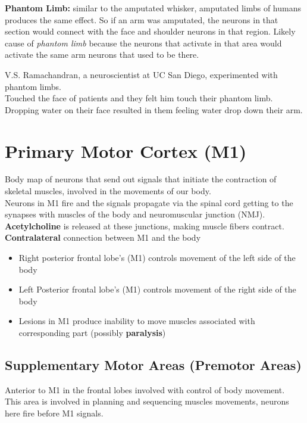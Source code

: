 \documentclass{article}
\begin{document}
\noindent \textbf{Phantom Limb:} similar to the amputated whisker, amputated limbs of humans produces the same effect. So if an arm was amputated, the neurons in that section would connect with the face and shoulder neurons in that region. Likely cause of \textit{phantom limb} because the neurons that activate in that area would activate the same arm neurons that used to be there. 

V.S. Ramachandran, a neuroscientist at UC San Diego, experimented with phantom limbs. \\
Touched the face of patients and they felt him touch their phantom limb. Dropping water on their face resulted in them feeling water drop down their arm. \\

\section{Primary Motor Cortex (M1)} 
Body map of neurons that send out signals that initiate the contraction of skeletal muscles, involved in the movements of our body. \\

Neurons in M1 fire and the signals propagate via the spinal cord getting to the synapses with muscles of the body and neuromuscular junction (NMJ). \textbf{Acetylcholine} is released at these junctions, making muscle fibers contract. \\

\noindent \textbf{Contralateral} connection between M1 and the body
\begin{itemize}
    \item Right posterior frontal lobe's (M1) controls movement of the left side of the body
    \item Left Posterior frontal lobe's (M1) controls movement of the right side of the body
    \item Lesions in M1 produce inability to move muscles associated with corresponding part (possibly \textbf{paralysis}) 
\end{itemize}

\subsection{Supplementary Motor Areas (Premotor Areas)}
Anterior to M1 in the frontal lobes involved with control of body movement. \\
This area is involved in planning and sequencing muscles movements, neurons here fire before M1 signals. \\
\end{document}
